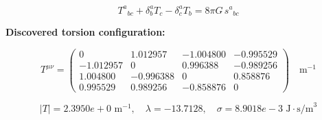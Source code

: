 
\begin{equation}
  T^a{}_{bc} + \delta^a_b T_c - \delta^a_c T_b = 8\pi G \, s^a{}_{bc}
\end{equation}

\textbf{Discovered torsion configuration:}

\begin{equation}
  T^{\mu\nu} = \begin{pmatrix}
    0 & 1.012957 & -1.004800 & -0.995529 \\
    -1.012957 & 0 & 0.996388 & -0.989256 \\
    1.004800 & -0.996388 & 0 & 0.858876 \\
    0.995529 & 0.989256 & -0.858876 & 0
  \end{pmatrix} \quad \text{m}^{-1}
\end{equation}

\begin{equation}
  |T| = 2.3950e+0 \text{ m}^{-1}, \quad
  \lambda = -13.7128, \quad
  \sigma = 8.9018e-3 \text{ J}\cdot\text{s/m}^3
\end{equation}